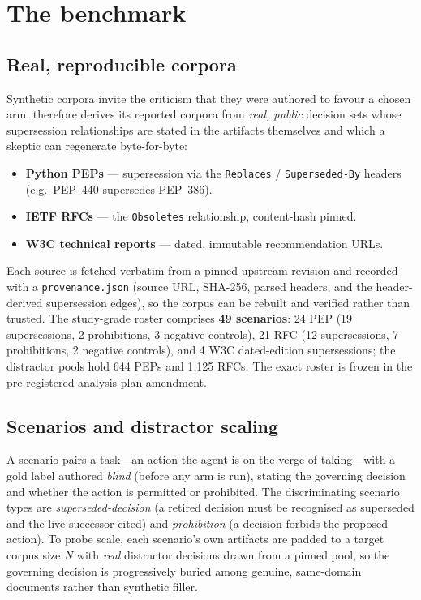 \section{The \benchname{} benchmark}

\subsection{Real, reproducible corpora}
Synthetic corpora invite the criticism that they were authored to favour a chosen
arm. \benchname{} therefore derives its reported corpora from \emph{real, public}
decision sets whose supersession relationships are stated in the artifacts
themselves and which a skeptic can regenerate byte-for-byte:
\begin{itemize}
  \item \textbf{Python PEPs} --- supersession via the \texttt{Replaces} /
        \texttt{Superseded-By} headers (e.g.\ PEP~440 supersedes PEP~386).
  \item \textbf{IETF RFCs} --- the \texttt{Obsoletes} relationship, content-hash
        pinned.
  \item \textbf{W3C technical reports} --- dated, immutable recommendation URLs.
\end{itemize}
Each source is fetched verbatim from a pinned upstream revision and recorded with
a \texttt{provenance.json} (source URL, SHA-256, parsed headers, and the
header-derived supersession edges), so the corpus can be rebuilt and verified
rather than trusted. The study-grade roster comprises \textbf{49 scenarios}: 24
PEP (19 supersessions, 2 prohibitions, 3 negative controls), 21 RFC (12
supersessions, 7 prohibitions, 2 negative controls), and 4 W3C dated-edition
supersessions; the distractor pools hold 644 PEPs and 1{,}125 RFCs. The exact
roster is frozen in the pre-registered analysis-plan amendment.

\subsection{Scenarios and distractor scaling}
A scenario pairs a task---an action the agent is on the verge of taking---with a
gold label authored \emph{blind} (before any arm is run), stating the governing
decision and whether the action is permitted or prohibited. The discriminating
scenario types are \emph{superseded-decision} (a retired decision must be
recognised as superseded and the live successor cited) and \emph{prohibition} (a
decision forbids the proposed action). To probe scale, each scenario's own
artifacts are padded to a target corpus size $N$ with \emph{real} distractor
decisions drawn from a pinned pool, so the governing decision is progressively
buried among genuine, same-domain documents rather than synthetic filler.

